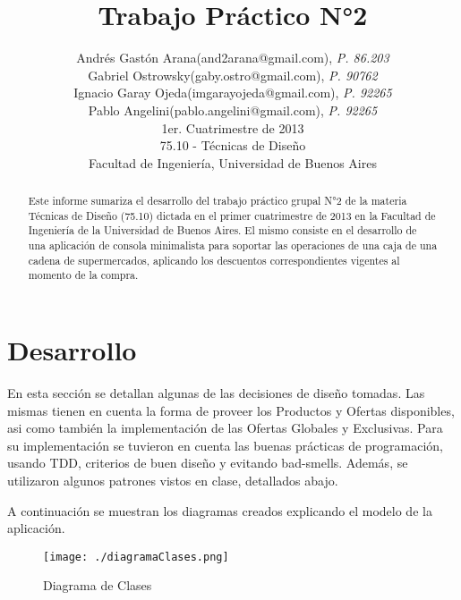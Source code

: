 \documentclass[a4paper,11pt]{article}
\title{\textbf{Trabajo Práctico N°2}}
\author{
  Andrés Gastón Arana(and2arana@gmail.com), \textit{P. 86.203}     \\
  Gabriel Ostrowsky(gaby.ostro@gmail.com), \textit{P. 90762}       \\
  Ignacio Garay Ojeda(imgarayojeda@gmail.com), \textit{P. 92265}   \\
  Pablo Angelini(pablo.angelini@gmail.com), \textit{P. 92265}      \\
  \normalsize{1er. Cuatrimestre de 2013}                           \\
  \normalsize{75.10 - Técnicas de Diseño}                          \\
  \normalsize{Facultad de Ingeniería, Universidad de Buenos Aires}
}
\date{}
\begin{document}
\thispagestyle{empty}
\maketitle

\begin{abstract}

  Este informe sumariza el desarrollo del trabajo práctico grupal N°2 de la
  materia Técnicas de Diseño (75.10) dictada en el primer cuatrimestre de 2013
  en la Facultad de Ingeniería de la Universidad de Buenos Aires. El mismo
  consiste en el desarrollo de una aplicación de consola minimalista para
  soportar las operaciones de una caja de una cadena de supermercados, 
  aplicando los descuentos correspondientes vigentes al momento de la compra.

\end{abstract}

\clearpage

\tableofcontents
\clearpage


\part{Desarrollo}
En esta sección se detallan algunas de las decisiones de diseño tomadas. Las 
mismas tienen en cuenta la forma de proveer los Productos y Ofertas disponibles, 
asi como también la implementación de las Ofertas Globales y Exclusivas.
Para su implementación se tuvieron en cuenta las buenas prácticas de programación, 
usando TDD, criterios de buen diseño y evitando bad-smells. Además, se utilizaron 
algunos patrones vistos en clase, detallados abajo.

A continuación se muestran los diagramas creados explicando el modelo de la aplicación.

\begin{figure}[!htp]
\begin{center}
\texttt{[image: ./diagramaClases.png]}
\end{center}
\caption{Diagrama de Clases} \label{fig001}
\end{figure}
\end{document}
